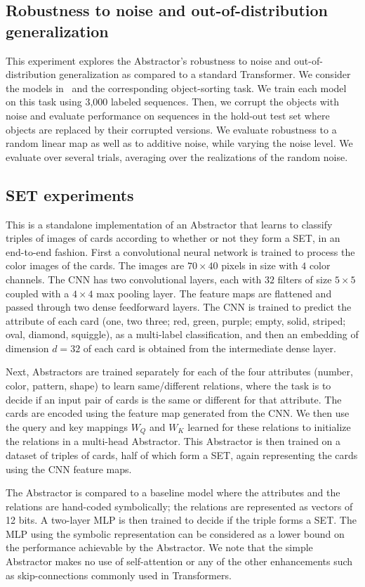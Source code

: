 \subsection{Robustness to noise and out-of-distribution generalization}
This experiment explores the Abstractor's robustness to noise and out-of-distribution generalization as compared to a standard Transformer. We consider the models in~ and the corresponding object-sorting task. We train each model on this task using 3,000 labeled sequences. Then, we corrupt the objects with noise and evaluate performance on sequences in the hold-out test set where objects are replaced by their corrupted versions. We evaluate robustness to a random linear map as well as to additive noise, while varying the noise level. We evaluate over several trials, averaging over the realizations of the random noise.

\subsection{SET experiments}

This is a standalone implementation of an Abstractor that learns to classify triples of images of cards according 
to whether or not they form a SET, in an end-to-end fashion. First a convolutional neural network is trained to process the color images of the cards. The images are $70 \times 40$ pixels in size with $4$ color channels. The CNN has two convolutional layers, each with $32$ filters of size $5\times 5$ coupled with a $4\times 4$ max pooling layer. The feature maps are flattened and passed through two dense feedforward layers. The CNN is trained to predict the attribute of each card (one, two three; red, green, purple; empty, solid, striped; oval, diamond, squiggle), as a multi-label classification, and then an embedding of dimension $d=32$ of each card is obtained from the intermediate dense layer. 

Next, Abstractors are trained separately for each of the four attributes (number, color, pattern, shape) to learn same/different relations, where the task is to decide if an input pair of cards is the same or different for that attribute. The cards are encoded using the feature map generated from the CNN. We then use the query and key mappings $W_Q$ and $W_K$ learned for these relations to initialize the relations in a multi-head Abstractor. This Abstractor is then trained on a dataset of triples of cards, half of which form a SET, again representing the cards using the CNN feature maps.

The Abstractor is compared to a baseline model where the attributes and the relations are hand-coded symbolically; the relations are represented as vectors of 12 bits. A two-layer MLP is then trained to decide if the triple forms a SET. The MLP using the symbolic representation can be considered as a lower bound on the performance achievable by the Abstractor. We note that the simple Abstractor makes no use of self-attention or any of the other enhancements such as skip-connections commonly used in Transformers.
